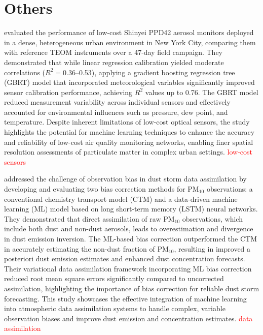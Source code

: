 \documentclass[11pt]{article}
\begin{document}
\section{Others}
\citet{johnson2018using} evaluated the performance of low-cost Shinyei PPD42 aerosol monitors deployed in a dense, heterogeneous urban environment in New York City, comparing them with reference TEOM instruments over a 47-day field campaign. They demonstrated that while linear regression calibration yielded moderate correlations (\(R^2 = 0.36\)–0.53), applying a gradient boosting regression tree (GBRT) model that incorporated meteorological variables significantly improved sensor calibration performance, achieving \(R^2\) values up to 0.76. The GBRT model reduced measurement variability across individual sensors and effectively accounted for environmental influences such as pressure, dew point, and temperature. Despite inherent limitations of low-cost optical sensors, the study highlights the potential for machine learning techniques to enhance the accuracy and reliability of low-cost air quality monitoring networks, enabling finer spatial resolution assessments of particulate matter in complex urban settings. \textcolor{red}{low-cost sensors}

\citet{jin2019machine} addressed the challenge of observation bias in dust storm data assimilation by developing and evaluating two bias correction methods for PM$_{10}$ observations: a conventional chemistry transport model (CTM) and a data-driven machine learning (ML) model based on long short-term memory (LSTM) neural networks. They demonstrated that direct assimilation of raw PM$_{10}$ observations, which include both dust and non-dust aerosols, leads to overestimation and divergence in dust emission inversion. The ML-based bias correction outperformed the CTM in accurately estimating the non-dust fraction of PM$_{10}$, resulting in improved a posteriori dust emission estimates and enhanced dust concentration forecasts. Their variational data assimilation framework incorporating ML bias correction reduced root mean square errors significantly compared to uncorrected assimilation, highlighting the importance of bias correction for reliable dust storm forecasting. This study showcases the effective integration of machine learning into atmospheric data assimilation systems to handle complex, variable observation biases and improve dust emission and concentration estimates. \textcolor{red}{data assimilation}
\end{document}
